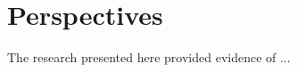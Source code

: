 \chapter{Perspectives}
\label{chap:perspectives}

The research presented here provided evidence of ...
